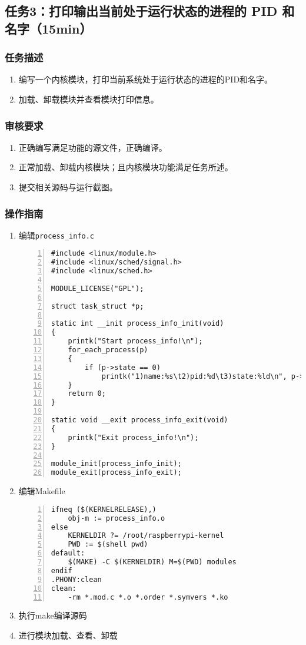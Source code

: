 \documentclass{article}
\begin{document}
\newpage

\subsection{任务3：打印输出当前处于运行状态的进程的 PID 和名字（15min）}

\subsubsection{任务描述}
\begin{enumerate}
	\item 编写一个内核模块，打印当前系统处于运行状态的进程的PID和名字。
	\item 加载、卸载模块并查看模块打印信息。
\end{enumerate}

\subsubsection{审核要求}
\begin{enumerate}
	\item 正确编写满足功能的源文件，正确编译。
	\item 正常加载、卸载内核模块；且内核模块功能满足任务所述。
	\item 提交相关源码与运行截图。
\end{enumerate}

\subsubsection{操作指南}
\begin{enumerate}
	\item 编辑\verb|process_info.c|
	      \begin{lstlisting}[numbers=left]
#include <linux/module.h>
#include <linux/sched/signal.h>
#include <linux/sched.h>

MODULE_LICENSE("GPL");

struct task_struct *p;

static int __init process_info_init(void)
{
	printk("Start process_info!\n");
	for_each_process(p)
	{
		if (p->state == 0)
			printk("1)name:%s\t2)pid:%d\t3)state:%ld\n", p->comm, p->pid, p->state);
	}
	return 0;
}

static void __exit process_info_exit(void)
{
	printk("Exit process_info!\n");
}

module_init(process_info_init);
module_exit(process_info_exit);

\end{lstlisting}
	\item 编辑Makefile
	      \begin{lstlisting}[numbers=left]
ifneq ($(KERNELRELEASE),)
	obj-m := process_info.o
else
	KERNELDIR ?= /root/raspberrypi-kernel
	PWD := $(shell pwd)
default:
	$(MAKE) -C $(KERNELDIR) M=$(PWD) modules
endif
.PHONY:clean
clean:
	-rm *.mod.c *.o *.order *.symvers *.ko

\end{lstlisting}
	\item 执行make编译源码
	\item 进行模块加载、查看、卸载
\end{enumerate}
\end{document}
